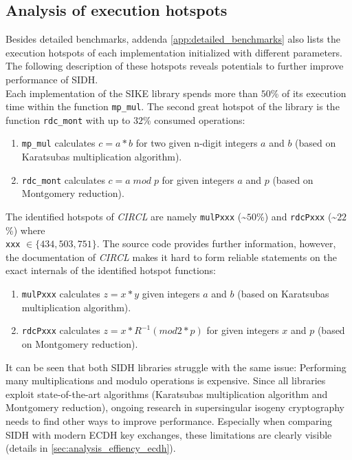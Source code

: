 \subsection{Analysis of execution hotspots}\label{sec:analysis_sidh_hotspots}
Besides detailed benchmarks, addenda \ref{app:detailed_benchmarks} also lists the execution hotspots of each implementation initialized with different parameters. The following description of these hotspots reveals potentials to further improve performance of \gls{SIDH}.\\
Each implementation of the \gls{SIKE} library spends more than $50$\% of its execution time within the function \texttt{mp\_mul}. The second great hotspot of the library is the function \texttt{rdc\_mont} with up to $32$\% consumed operations:
\begin{enumerate}
\item \texttt{mp\_mul} calculates $c=a*b$ for two given n-digit integers $a$ and $b$ (based on Karatsubas multiplication algorithm).
\item \texttt{rdc\_mont} calculates $c = a\;mod\;p$ for given integers $a$ and $p$ (based on Montgomery reduction).
\end{enumerate}
The identified hotspots of \textit{\gls{CIRCL}} are namely \texttt{mulPxxx} (\textasciitilde $50$\%) and \texttt{rdcPxxx} (\textasciitilde $22$\%) where \\\texttt{xxx} $\in \{434, 503, 751\}$. The source code provides further information, however, the documentation of \textit{\gls{CIRCL}} makes it hard to form reliable statements on the exact internals of the identified hotspot functions:
\begin{enumerate}
\item \texttt{mulPxxx} calculates $z=x*y$ given integers $a$ and $b$ (based on Karatsubas multiplication algorithm).
\item \texttt{rdcPxxx} calculates $z = x*R^{-1} (mod 2*p)$ for given integers $x$ and $p$ (based on Montgomery reduction).
\end{enumerate}
It can be seen that both \gls{SIDH} libraries struggle with the same issue: Performing many multiplications and modulo operations is expensive. Since all libraries exploit state-of-the-art algorithms (Karatsubas multiplication algorithm and Montgomery reduction), ongoing research in supersingular isogeny cryptography needs to find other ways to improve performance. Especially when comparing \gls{SIDH} with modern \gls{ECDH} key exchanges, these limitations are clearly visible (details in \autoref{sec:analysis_effiency_ecdh}).

